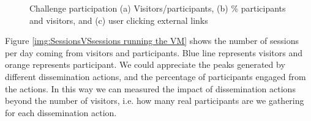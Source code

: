 \documentclass{article}
\begin{document}
\begin{figure}[t]
	\begin{center}
	\end{center}
	\caption{Challenge participation  (a) Visitors/participants, (b) \% participants and visitors, and (c) user clicking external links}
	\label{img:visitorsVSparticipants}
\end{figure} 





Figure \ref{img:SessionsVSsessions running the VM} shows the number of sessions per day coming from visitors and participants. Blue line represents visitors and orange represents  participant. We could appreciate the peaks generated by different dissemination actions, and the percentage of participants engaged from the actions. In this way we can measured the impact of dissemination actions beyond the number of visitors, i.e. how many real participants are we gathering for each dissemination action.  
\end{document}
